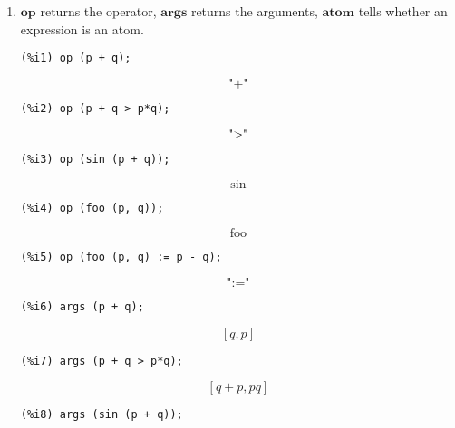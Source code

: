 \documentclass[12pt,leqno]{article}
\begin{document}
\begin{enumerate}
\item $\mathbf{op}$ returns the operator, $\mathbf{args}$ returns the arguments,
$\mathbf{atom}$ tells whether an expression is an atom.
\begin{verbatim}
(%i1) op (p + q);
\end{verbatim}
\begin{dmath}[number={\(\mathop{\mathrm{\%o}_{1}}\)}]
\text{"+"}
\end{dmath}
\begin{verbatim}
(%i2) op (p + q > p*q);
\end{verbatim}
\begin{dmath}[number={\(\mathop{\mathrm{\%o}_{2}}\)}]
\text{"\textgreater "}
\end{dmath}
\begin{verbatim}
(%i3) op (sin (p + q));
\end{verbatim}
\begin{dmath}[number={\(\mathop{\mathrm{\%o}_{3}}\)}]
\sin
\end{dmath}
\begin{verbatim}
(%i4) op (foo (p, q));
\end{verbatim}
\begin{dmath}[number={\(\mathop{\mathrm{\%o}_{4}}\)}]
\mathop{\mathrm{foo}}
\end{dmath}
\begin{verbatim}
(%i5) op (foo (p, q) := p - q);
\end{verbatim}
\begin{dmath}[number={\(\mathop{\mathrm{\%o}_{5}}\)}]
\text{":="}
\end{dmath}
\begin{verbatim}
(%i6) args (p + q);
\end{verbatim}
\begin{dmath}[number={\(\mathop{\mathrm{\%o}_{6}}\)}]
\left[q, p\right]
\end{dmath}
\begin{verbatim}
(%i7) args (p + q > p*q);
\end{verbatim}
\begin{dmath}[number={\(\mathop{\mathrm{\%o}_{7}}\)}]
\left[q+p, p q\right]
\end{dmath}
\begin{verbatim}
(%i8) args (sin (p + q));
\end{verbatim}
\begin{dmath}[number={\(\mathop{\mathrm{\%o}_{8}}\)}]

\end{dmath}
\end{enumerate}
\end{document}
